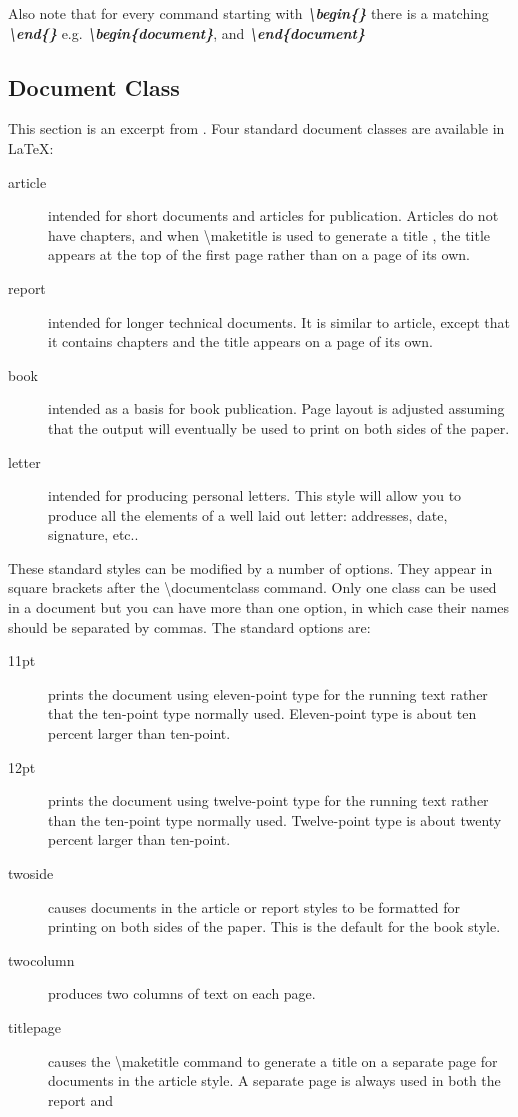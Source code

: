 Also note that for every command starting with \emph{\textbf{\textbackslash begin\{\}}} there is a matching \emph{\textbf{\textbackslash end\{\}}} e.g. \emph{\textbf{\textbackslash begin\{document\}}}, and \emph{\textbf{\textbackslash end\{document\}}}

\subsection{Document Class}
This section is an excerpt from \cite{warbrick94}.
Four standard document classes are available in \LaTeX:
\begin{description}
\item[article] intended for short documents and articles for publication. Articles do not have chapters,
and when \textbackslash maketitle is used to generate a title , the title appears at
the top of the first page rather than on a page of its own.
\item[report] intended for longer technical documents. It is similar to article, except that it contains
chapters and the title appears on a page of its own.
\item[book] intended as a basis for book publication. Page layout is adjusted assuming that the output
will eventually be used to print on both sides of the paper.
\item[letter] intended for producing personal letters. This style will allow you to produce all the elements of a well laid out letter: addresses, date, signature, etc..
\end{description}

These standard styles can be modified by a number of options. They appear in square brackets after the \textbackslash documentclass command. Only one class can be used in a document but you can have more than one option, in which case their names should be separated by commas. The standard options are:
\begin{description}
\item[11pt] prints the document using eleven-point type for the running text rather that the ten-point
type normally used. Eleven-point type is about ten percent larger than ten-point.
\item [12pt] prints the document using twelve-point type for the running text rather than the ten-point
type normally used. Twelve-point type is about twenty percent larger than ten-point.
\item[twoside] causes documents in the article or report styles to be formatted for printing on both
sides of the paper. This is the default for the book style.
\item [twocolumn] produces two columns of text on each page.
\item [titlepage] causes the \textbackslash maketitle command to generate a title on a separate page for documents
in the article style. A separate page is always used in both the report and
\end{description}


